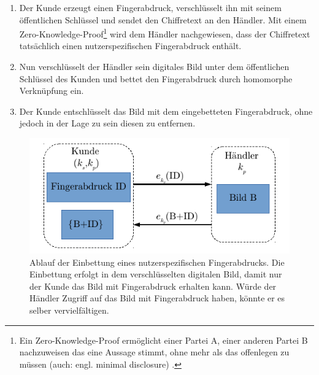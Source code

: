 \begin{enumerate}
	\item Der Kunde erzeugt einen Fingerabdruck, verschlüsselt ihn mit seinem öffentlichen Schlüssel und sendet den Chiffretext an den Händler. Mit einem Zero-Knowledge-Proof\footnote{Ein Zero-Knowledge-Proof ermöglicht einer Partei A, einer anderen Partei B nachzuweisen das eine Aussage stimmt, ohne mehr als das offenlegen zu müssen (auch: engl. minimal disclosure) \cite{brassard1988minimum}.} wird dem Händler nachgewiesen, dass der Chiffretext tatsächlich einen nutzerspezifischen Fingerabdruck enthält.
	\item Nun verschlüsselt der Händler sein digitales Bild unter dem öffentlichen Schlüssel des Kunden und bettet den Fingerabdruck durch homomorphe Verknüpfung ein.
	\item Der Kunde entschlüsselt das Bild mit dem eingebetteten Fingerabdruck, ohne jedoch in der Lage zu sein diesen zu entfernen.
\end{enumerate}

\begin{figure}[h] 
	\begin{center}
		\includegraphics{fig/Finger}
		\caption{Ablauf der Einbettung eines nutzerspezifischen Fingerabdrucks. Die Einbettung erfolgt in dem verschlüsselten digitalen Bild, damit nur der Kunde das Bild mit Fingerabdruck erhalten kann. Würde der Händler Zugriff auf das Bild mit Fingerabdruck haben, könnte er es selber vervielfältigen. }
		\label{fig:Finger}
	\end{center}
\end{figure}

